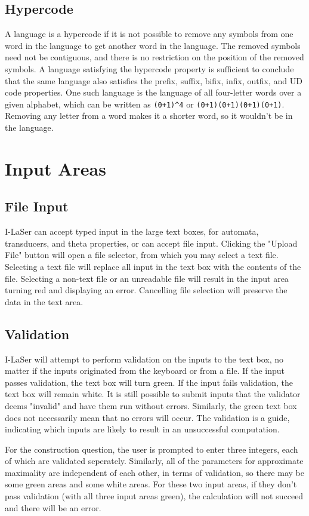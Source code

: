\documentclass{article}
\begin{document}
\subsection{Hypercode}
A language is a hypercode if it is not possible to remove any symbols from one word in the language to get another word in the language. The removed symbols need not be contiguous, and there is no restriction on the position of the removed symbols. A language satisfying the hypercode property is sufficient to conclude that the same language also satisfies the prefix, suffix, bifix, infix, outfix, and UD code properties. One such language is the language of all four-letter words over a given alphabet, which can be written as \verb-(0+1)^4- or \verb-(0+1)(0+1)(0+1)(0+1)-. Removing any letter from a word makes it a shorter word, so it wouldn't be in the language. 

\section{Input Areas}

\subsection{File Input}
I-LaSer can accept typed input in the large text boxes, for automata, transducers, and theta properties, or can accept file input. Clicking the "Upload File" button will open a file selector, from which you may select a text file. Selecting a text file will replace all input in the text box with the contents of the file. Selecting a non-text file or an unreadable file will result in the input area turning red and displaying an error. Cancelling file selection will preserve the data in the text area. 

\subsection{Validation}
I-LaSer will attempt to perform validation on the inputs to the text box, no matter if the inputs originated from the keyboard or from a file. If the input passes validation, the text box will turn green. If the input fails validation, the text box will remain white. It is still possible to submit inputs that the validator deems "invalid" and have them run without errors. Similarly, the green text box does not necessarily mean that no errors will occur. 
The validation is a guide, indicating which inputs are likely to result in an unsuccessful computation.
\par For the construction question, the user is prompted to enter three integers, each of which are validated seperately.
Similarly, all of the parameters for approximate maximality are independent of each other, in terms of validation, so there may be some green areas and some white areas.
For these two input areas, if they don't pass validation (with all three input areas green), the calculation will not succeed and there will be an error.
\end{document}
